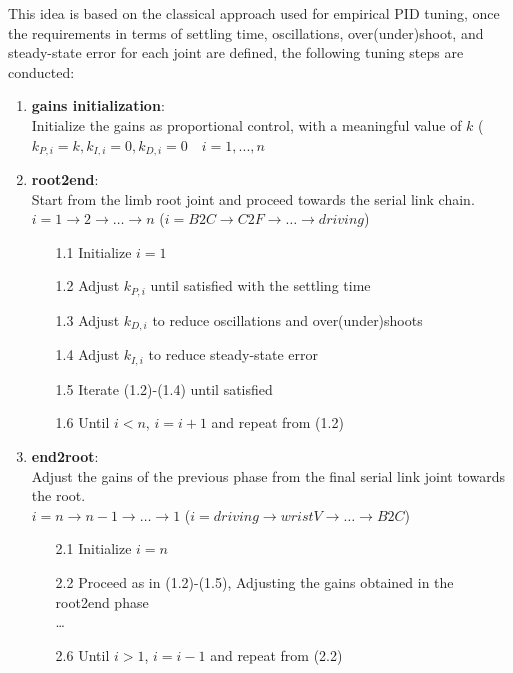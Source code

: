 This idea is based on the classical approach used for empirical PID tuning, once the requirements in terms of settling time, oscillations, over(under)shoot, and steady-state error for each joint are defined, the following tuning steps are conducted: 
\begin{enumerate}
    \setlength\itemsep{-0.7em} 
    \item \textbf{gains initialization}:\\
    Initialize the gains as proportional control, with a meaningful value of $k$ ($k_{P,i} = k, k_{I,i} = 0, k_{D,i}=0 \quad i=1,...,n$ 
    \item \textbf{root2end}: \\
    Start from the limb root joint and proceed towards the serial link chain.\\
    $i = 1\rightarrow2\rightarrow\dots\rightarrow n$ ($i = B2C\rightarrow C2F\rightarrow\dots\rightarrow driving$)
    \begin{enumerate}
        \setlength\itemsep{-0.7em} 
        \item[1.1] Initialize $i=1$
        \item[1.2] Adjust $k_{P,i}$ until satisfied with the settling time 
        \item[1.3] Adjust $k_{D,i}$ to reduce oscillations and over(under)shoots
        \item[1.4] Adjust $k_{I,i}$ to reduce steady-state error
        \item[1.5] Iterate (1.2)-(1.4) until satisfied
        \item[1.6] Until $i < n$, $i = i+1$ and repeat from (1.2)
    \end{enumerate}
    \item \textbf{end2root}: \\
    Adjust the gains of the previous phase from the final serial link joint towards the root.\\
    $i = n\rightarrow n-1\rightarrow\dots\rightarrow 1$ ($i = driving\rightarrow wristV\rightarrow\dots\rightarrow B2C$)
    \begin{enumerate}
        \setlength\itemsep{-0.7em} 
        \item[2.1] Initialize $i=n$
        \item[2.2] Proceed as in (1.2)-(1.5), Adjusting the gains obtained in the root2end phase\\
        \dots
        \item[2.6] Until $i > 1$, $i = i-1$ and repeat from (2.2)
    \end{enumerate}
\end{enumerate}

